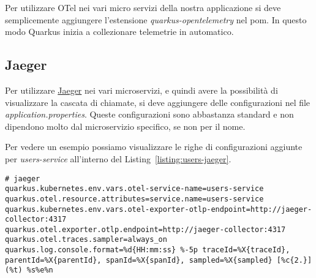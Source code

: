\myskip

Per utilizzare OTel nei vari micro servizi della nostra applicazione si deve semplicemente aggiungere l'estensione \textit{quarkus-opentelemetry} nel pom. In questo modo Quarkus inizia a collezionare telemetrie in automatico.

\subsection{Jaeger}
Per utilizzare \href{https://www.jaegertracing.io}{Jaeger} nei vari microservizi, e quindi avere la possibilità di visualizzare la cascata di chiamate, si deve aggiungere delle configurazioni nel file \textit{application.properties}. Queste configurazioni sono abbastanza standard e non dipendono molto dal microservizio specifico, se non per il nome.

Per vedere un esempio possiamo visualizzare le righe di configurazioni aggiunte per \textit{users-service} all'interno del Listing~\ref{listing:users-jaeger}.
\begin{lstlisting}[caption=Jaeger configuration for \textit{users-service}, label=listing:users-jaeger]
# jaeger
quarkus.kubernetes.env.vars.otel-service-name=users-service
quarkus.otel.resource.attributes=service.name=users-service
quarkus.kubernetes.env.vars.otel-exporter-otlp-endpoint=http://jaeger-collector:4317
quarkus.otel.exporter.otlp.endpoint=http://jaeger-collector:4317
quarkus.otel.traces.sampler=always_on
quarkus.log.console.format=%d{HH:mm:ss} %-5p traceId=%X{traceId}, parentId=%X{parentId}, spanId=%X{spanId}, sampled=%X{sampled} [%c{2.}] (%t) %s%e%n
\end{lstlisting}